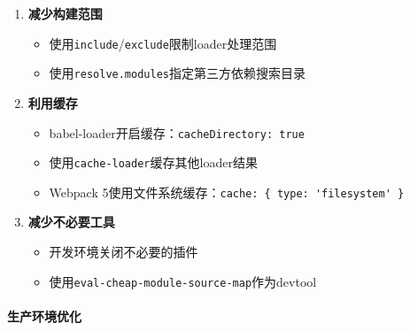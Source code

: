\begin{enumerate}
\def\labelenumi{\arabic{enumi}.}
\tightlist
\item
  \textbf{减少构建范围}

  \begin{itemize}
  \tightlist
  \item
    使用\passthrough{\lstinline!include!}/\passthrough{\lstinline!exclude!}限制loader处理范围
  \item
    使用\passthrough{\lstinline!resolve.modules!}指定第三方依赖搜索目录
  \end{itemize}
\item
  \textbf{利用缓存}

  \begin{itemize}
  \tightlist
  \item
    babel-loader开启缓存：\passthrough{\lstinline!cacheDirectory: true!}
  \item
    使用\passthrough{\lstinline!cache-loader!}缓存其他loader结果
  \item
    Webpack
    5使用文件系统缓存：\passthrough{\lstinline!cache: \{ type: 'filesystem' \}!}
  \end{itemize}
\item
  \textbf{减少不必要工具}

  \begin{itemize}
  \tightlist
  \item
    开发环境关闭不必要的插件
  \item
    使用\passthrough{\lstinline!eval-cheap-module-source-map!}作为devtool
  \end{itemize}
\end{enumerate}

\paragraph{生产环境优化}\label{ux751fux4ea7ux73afux5883ux4f18ux5316}

